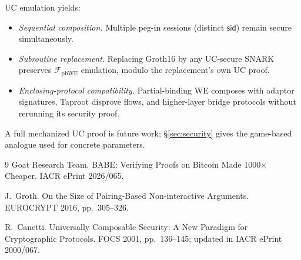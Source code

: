 \documentclass[11pt]{article}
\begin{document}
UC emulation yields:
\begin{itemize}
  \item \emph{Sequential composition.} Multiple peg-in sessions
    (distinct $\mathsf{sid}$) remain secure simultaneously.
  \item \emph{Subroutine replacement.} Replacing Groth16 by any
    UC-secure SNARK preserves $\mathcal{F}_{\mathrm{pbWE}}$
    emulation, modulo the replacement's own UC proof.
  \item \emph{Enclosing-protocol compatibility.} Partial-binding WE
    composes with adaptor signatures, Taproot disprove flows, and
    higher-layer bridge protocols without rerunning its security
    proof.
\end{itemize}

A full mechanized UC proof is future work; \S\ref{sec:security} gives
the game-based analogue used for concrete parameters.

\begin{thebibliography}{9}
Goat Research Team.
\newblock BABE: Verifying Proofs on Bitcoin Made 1000$\times$ Cheaper.
\newblock IACR ePrint 2026/065.

J.~Groth.
\newblock On the Size of Pairing-Based Non-interactive Arguments.
\newblock EUROCRYPT 2016, pp.\ 305--326.

R.~Canetti.
\newblock Universally Composable Security: A New Paradigm for
Cryptographic Protocols.
\newblock FOCS 2001, pp.\ 136--145; updated in IACR ePrint 2000/067.
\end{thebibliography}
\end{document}
